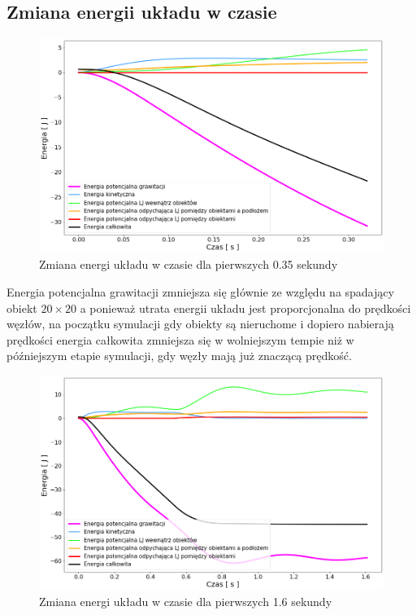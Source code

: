 \documentclass[12pt, letterpaper]{report}
\begin{document}
    \subsection{Zmiana energii układu w czasie}
    \begin{figure}[H]
        \centering
        \includegraphics[width=16cm]{pressure_energy02_01}
        \caption{
            Zmiana energi układu w czasie dla pierwszych 0.35 sekundy
        }
    \end{figure}
    
    Energia potencjalna grawitacji zmniejsza się głównie ze względu na spadający obiekt $20 \times 20$
    a ponieważ utrata energii układu jest proporcjonalna do prędkości węzłów, na początku symulacji gdy 
    obiekty są nieruchome i dopiero nabierają prędkości energia całkowita zmniejsza się w wolniejszym tempie niż 
    w późniejszym etapie symulacji, gdy węzły mają już znaczącą prędkość.

    \begin{figure}[H]
        \centering
        \includegraphics[width=16cm]{pressure_energy02_02}
        \caption{
            Zmiana energi układu w czasie dla pierwszych 1.6 sekundy
        }
    \end{figure}
\end{document}
